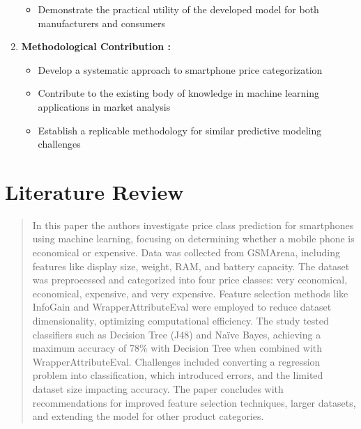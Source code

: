 \documentclass[12pt]{report}
\begin{document}
\begin{enumerate}
	      \begin{itemize}
		      \setlength\itemsep{-1.5em}
		      \item Demonstrate the practical utility of the developed model for both manufacturers and consumers
	      \end{itemize}
	\item{\textbf{Methodological Contribution :}}
	      \vspace{-1.65em}
	      \begin{itemize}
		      \setlength\itemsep{-1.5em}
		      \item Develop a systematic approach to smartphone price categorization
		      \item Contribute to the existing body of knowledge in machine learning applications in market analysis
		      \item Establish a replicable methodology for similar predictive modeling challenges
	      \end{itemize}
\end{enumerate}

\chapter{Literature Review}
\begin{quotation}
  In this paper \cite{asim2018} the authors investigate price class prediction for smartphones using machine learning, focusing on determining whether a mobile phone is economical or expensive. Data was collected from GSMArena, including features like display size, weight, RAM, and battery capacity. The dataset was preprocessed and categorized into four price classes: very economical, economical, expensive, and very expensive. Feature selection methods like InfoGain and WrapperAttributeEval were employed to reduce dataset dimensionality, optimizing computational efficiency. The study tested classifiers such as Decision Tree (J48) and Naïve Bayes, achieving a maximum accuracy of 78\% with Decision Tree when combined with WrapperAttributeEval. Challenges included converting a regression problem into classification, which introduced errors, and the limited dataset size impacting accuracy. The paper concludes with recommendations for improved feature selection techniques, larger datasets, and extending the model for other product categories.
\end{quotation}
\end{document}
